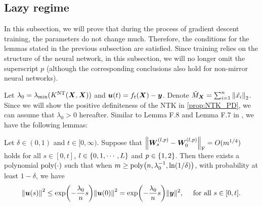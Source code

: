 \subsection{Lazy regime}\label{subsec:Lazy}

In this subsection, we will prove that during the process of gradient descent training, the parameters do not change much.
Therefore, the conditions for the lemmas stated in the previous subsection are satisfied.
Since training relies on the structure of the neural network, in this subsection, we will no longer omit the superscript $p$ (although the corresponding conclusions also hold for non-mirror neural networks).


Let $\lambda_0 = \lambda_{\min} (K^{\mathrm{NT}}(\bm{X},\bm{X}))$ and $\bm{u}(t)=f_t(\bm{X})-\bm{y}$.
Denote $\tilde{M}_{\bm{X}} = \sum_{i=1}^n\norm{\tilde{x_i}}_2 $.
Since we will show the positive definiteness of the NTK in \cref{prop:NTK_PD}, we can assume that $\lambda_0 > 0$ hereafter.
Similar to Lemma F.8 and Lemma F.7 in \citet{arora2019_ExactComputation}, we have the following lemmas:


\begin{lemma}
  \label{lem:GradientFlow_ExpDecay}
  Let $\delta\in(0,1)$ and $t\in[0,\infty)$.
  Suppose that $\norm{\bm{W}^{(l,p)}_s - \bm{W}^{(l,p)}_0}_{\mathrm{F}} = O(m^{1/4})$ holds for all $s \in [0,t] $, $l\in \left\{0,1,\cdots,L\right\}$ and $p\in\left\{1,2\right\}$.
  Then there exists a polynomial $\mathrm{poly}(\cdot)$ such that when $m\geq\poly\xkm{n,\lambda_0^{-1},\ln(1/\delta)}$,
  with probability at least $1-\delta$, we have
  \begin{align}
    \label{eq:GradientFlow_ExpDecay}\norm{\bm{u}(s)}^{2}\leq \exp\xkm{- \frac{\lambda_{0}}{n}s}\norm{\bm{u}(0)}^{2} = \exp\xkm{-\frac{\lambda_{0}}{n}s} \|\bm{y}\|^{2},\quad~\text{for all}~s\in [0,t].
  \end{align}
\end{lemma}

